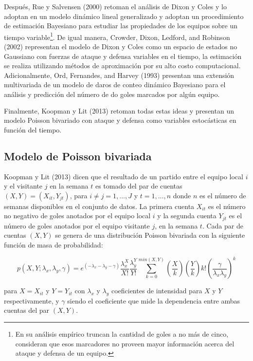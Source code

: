Después, Rue y Salvensen (2000) \cite{rue2000prediction} retoman el análisis de Dixon y Coles \cite{dixon1997modelling} y lo adoptan en un modelo dinámico lineal generalizado y adoptan un procedimiento de estimación Bayesiano para estudiar las propiedades de los equipos sobre un tiempo variable\footnote{En su análisis empírico truncan la cantidad de goles a no más de cinco, consideran que esos marcadores no proveen mayor información acerca del ataque y defensa de un equipo.}. De igual manera, Crowder, Dixon, Ledford, and Robinson (2002) \cite{crowder2002dynamic} representan el modelo de Dixon y Coles \cite{dixon1997modelling} como un espacio de estados no Gaussiano con fuerzas de ataque y defensa variables en el tiempo, la estimación se realiza utilizando métodos de aproximación por su alto costo computacional. Adicionalmente, Ord, Fernandes, and Harvey (1993) \cite{ord1993time} presentan una extensión multivariada de un modelo de daros de conteo dinámico Bayesiano para el análisis y predicción del número de do goles marcados por algún equipo.

Finalmente, Koopman y Lit (2013) \cite{koopman2013dynamic} retoman todas estas ideas y presentan un modelo Poisson bivariado con ataque y defensa como variables estocásticas en función del tiempo. 
\subsection{Modelo de Poisson bivariada}
\label{subsec:bivariate-poisson}

Koopman y Lit (2013) \cite{koopman2013dynamic} dicen que el resultado de un partido entre el equipo local $i$ y el visitante $j$ en la semana $t$ es tomado del par de cuentas $(X,Y) = (X_{it},Y_{jt})$, para $i\neq j = 1, ...,J$ y $t=1,...,n$ donde $n$ es el número de semanas disponibles en el conjunto de datos. La primera cuenta $X_{it}$ es el número no negativo de goles anotados por el equipo local $i$ y la segunda cuenta $Y_{jt}$ es el número de goles anotados por el equipo visitante $j$, en la semana $t$. Cada par de cuentas $(X,Y)$ se genera de una distribución Poisson bivariada con la siguiente función de masa de probabilidad:
 
\[p(X,Y;\lambda_x,\lambda_y,\gamma) = e^{(-\lambda_x-\lambda_y-\gamma)}\frac{\lambda^X_x}{X!}\frac{\lambda^Y_y}{Y!}\sum_{k=0}^{min(X,Y)}\left(\frac{X}{k}\right)\left(\frac{Y}{k}\right)k!\left(\frac{\gamma}{\lambda_x\lambda_y}\right)^k \]

para $X = X_{it}$ y $Y = Y_{it}$ con $\lambda_x$ y $\lambda_y$ coeficientes de intensidad para $X$ y $Y$ respectivamente, y $\gamma$ siendo el coeficiente que mide la dependencia entre ambas cuentas del par $(X,Y)$. 

